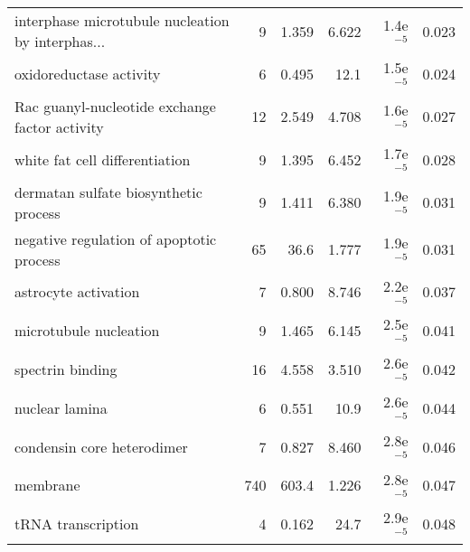 \begin{longtable}{lrrrrr}
 interphase microtubule nucleation by interphas... &                       9 &                   1.359 &      6.622 &          1.4e$^{-5}$ &                0.023 \\
                           oxidoreductase activity &                       6 &                   0.495 &       12.1 &          1.5e$^{-5}$ &                0.024 \\
    Rac guanyl-nucleotide exchange factor activity &                      12 &                   2.549 &      4.708 &          1.6e$^{-5}$ &                0.027 \\
                    white fat cell differentiation &                       9 &                   1.395 &      6.452 &          1.7e$^{-5}$ &                0.028 \\
             dermatan sulfate biosynthetic process &                       9 &                   1.411 &      6.380 &          1.9e$^{-5}$ &                0.031 \\
          negative regulation of apoptotic process &                      65 &                    36.6 &      1.777 &          1.9e$^{-5}$ &                0.031 \\
                              astrocyte activation &                       7 &                   0.800 &      8.746 &          2.2e$^{-5}$ &                0.037 \\
                            microtubule nucleation &                       9 &                   1.465 &      6.145 &          2.5e$^{-5}$ &                0.041 \\
                                  spectrin binding &                      16 &                   4.558 &      3.510 &          2.6e$^{-5}$ &                0.042 \\
                                    nuclear lamina &                       6 &                   0.551 &       10.9 &          2.6e$^{-5}$ &                0.044 \\
                        condensin core heterodimer &                       7 &                   0.827 &      8.460 &          2.8e$^{-5}$ &                0.046 \\
                                          membrane &                     740 &                   603.4 &      1.226 &          2.8e$^{-5}$ &                0.047 \\
                                tRNA transcription &                       4 &                   0.162 &       24.7 &          2.9e$^{-5}$ &                0.048 \\

\end{longtable}
